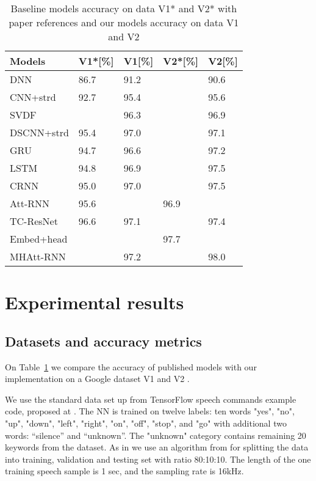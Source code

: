 \documentclass[a4paper]{article}
\begin{document}
\begin{table}[t]
  \caption{Baseline models accuracy on data V1* and V2* with paper references and our models accuracy on data V1 and V2}
  \label{tab:accuracy}
  \centering
  \begin{tabular}{p{1.8cm} p{1.2cm} p{0.9cm} p{1.2cm} p{0.9cm}}
    \toprule
    \textbf{Models} & \textbf{V1*[\%]} & \textbf{V1[\%]} & \textbf{V2*[\%]} & \textbf{V2[\%]}  \\
    \midrule
      DNN        & 86.7\cite{HELLO}    & 91.2 &      &  90.6  \\
      CNN+strd   & 92.7\cite{HELLO}    & 95.4 &      &  95.6  \\
      SVDF       &                     & 96.3 &      &  96.9  \\
      DSCNN+strd & 95.4\cite{HELLO}    & 97.0 &      &  97.1  \\
      GRU        & 94.7\cite{HELLO}    & 96.6 &      &  97.2  \\
      LSTM       & 94.8\cite{HELLO}    & 96.9 &      &  97.5  \\
      CRNN       & 95.0\cite{HELLO}    & 97.0 &      &  97.5  \\
      Att-RNN    & 95.6\cite{ATT2}     &      & 96.9\cite{ATT2} &        \\
      TC-ResNet  & 96.6\cite{TEMPCONV} & 97.1 &      &  97.4      \\
      Embed+head &                     &      & 97.7\cite{LIMSDATA} &        \\
      MHAtt-RNN  &                     & 97.2 &      &  98.0  \\
    \bottomrule
  \end{tabular}
  \vspace{-5mm} \end{table}

\section{Experimental results}

\subsection{Datasets and accuracy metrics}

On Table~\ref{tab:accuracy} we compare the accuracy of published models with our implementation on a Google dataset V1 \cite{DATA1} and V2 \cite{DATA2}.

We use the standard data set up from TensorFlow speech commands example code, proposed at \cite{DATA}. The NN is trained on twelve labels: ten words "yes", "no", "up", "down", "left", "right", "on", "off", "stop", and "go" with additional two words: “silence” and “unknown”. The "unknown" category contains remaining 20 keywords from the dataset. As in \cite{DATA, HELLO} we use an algorithm from \cite{CODE1} for splitting the data into training, validation and testing set with ratio 80:10:10. The length of the one training speech sample is 1 sec, and the sampling rate is 16kHz.
\end{document}
